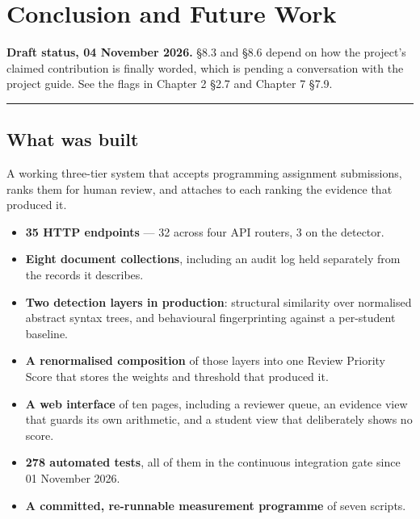 \hypertarget{conclusion-and-future-work}{%
\chapter{Conclusion and Future Work}\label{conclusion-and-future-work}}

\begin{draftnote}

\textbf{Draft status, 04 November 2026.} \S{}8.3 and \S{}8.6 depend on how the
project's claimed contribution is finally worded, which is pending a
conversation with the project guide. See the flags in Chapter 2 \S{}2.7 and
Chapter 7 \S{}7.9.

\end{draftnote}

\begin{center}\rule{0.5\linewidth}{0.5pt}\end{center}

\hypertarget{what-was-built}{%
\section{What was built}\label{what-was-built}}

A working three-tier system that accepts programming assignment
submissions, ranks them for human review, and attaches to each ranking
the evidence that produced it.

\begin{itemize}
\tightlist
\item
  \textbf{35 HTTP endpoints} --- 32 across four API routers, 3 on the
  detector.
\item
  \textbf{Eight document collections}, including an audit log held
  separately from the records it describes.
\item
  \textbf{Two detection layers in production}: structural similarity
  over normalised abstract syntax trees, and behavioural fingerprinting
  against a per-student baseline.
\item
  \textbf{A renormalised composition} of those layers into one Review
  Priority Score that stores the weights and threshold that produced it.
\item
  \textbf{A web interface} of ten pages, including a reviewer queue, an
  evidence view that guards its own arithmetic, and a student view that
  deliberately shows no score.
\item
  \textbf{278 automated tests}, all of them in the continuous
  integration gate since 01 November 2026.
\item
  \textbf{A committed, re-runnable measurement programme} of seven
  scripts.
\end{itemize}

